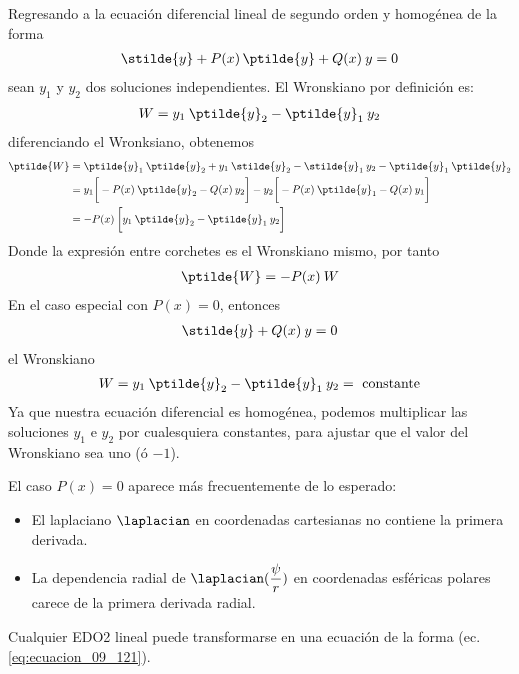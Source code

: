 Regresando a la ecuación diferencial lineal de segundo orden y homogénea de la forma
\begin{align}
\stilde{y} + P(x) \, \ptilde{y} + Q(x) \: y = 0
\label{eq:ecuacion_09_118}
\end{align}
sean $y_{1}$ y $y_{2}$ dos soluciones independientes. El Wronskiano por definición es:
\begin{align}
W = y_{1} \: \ptilde{y}_{2} - \ptilde{y}_{1} \: y_{2}
\label{eq:ecuacion_09_119}
\end{align}
diferenciando el Wronksiano, obtenemos
\begin{align*}
\ptilde{W} &= \ptilde{y}_{1} \: \ptilde{y}_{2} + y_{1} \: \stilde{y}_{2} - \stilde{y}_{1} \: y_{2} - \ptilde{y}_{1} \: \ptilde{y}_{2} \\
&= y_{1} \bigg[ - P(x) \: \ptilde{y}_{2} - Q(x) \: y_{2} \bigg] - y_{2} \bigg[ - P(x) \: \ptilde{y}_{1} - Q(x)  \: y_{1} \bigg] \\
&= - P(x) \: \bigg[ y_{1} \: \ptilde{y}_{2} - \ptilde{y}_{1} \: y_{2} \bigg]
\end{align*}
Donde la expresión entre corchetes es el Wronskiano mismo, por tanto
\begin{align}
\ptilde{W} = - P(x) \: W
\label{eq:ecuacion_09_120}
\end{align}
En el caso especial con $P(x) = 0$, entonces
\begin{align}
\stilde{y} + Q(x) \: y = 0
\label{eq:ecuacion_09_121}
\end{align}
el Wronskiano
\begin{align}
W = y_{1} \: \ptilde{y}_{2} - \ptilde{y}_{1} \: y_{2} = \mbox{ constante}
\label{eq:ecuacion_09_1202}
\end{align}
Ya que nuestra ecuación diferencial es homogénea, podemos multiplicar las soluciones $y_{1}$ e $y_{2}$ por cualesquiera constantes, para ajustar que el valor del Wronskiano sea uno (ó $-1$).
\par
El caso $P(x) = 0$ aparece más frecuentemente de lo esperado:
\begin{itemize}
\item El laplaciano $\laplacian$ en coordenadas cartesianas no contiene la primera derivada.
\item La dependencia radial de $\laplacian (\dfrac{\psi}{r})$ en coordenadas esféricas polares carece de la primera derivada radial.
\end{itemize}
Cualquier EDO2 lineal puede transformarse en una ecuación de la forma (ec. \ref{eq:ecuacion_09_121}).
\par
